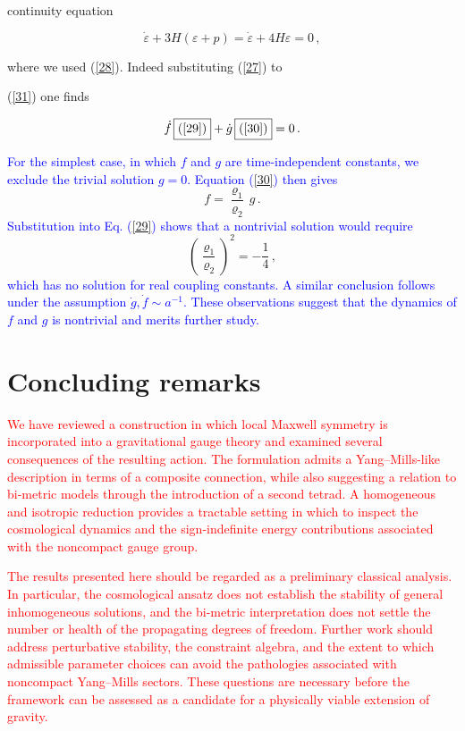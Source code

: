 \documentclass [prd,reprint,eqsecnum,nofootinbib]  {revtex4-1}
\newcommand{\corr}[1]{\textcolor{blue}{#1}}
\newcommand{\add}[1]{\textcolor{red}{#1}}
\begin{document}
continuity equation

\begin{equation}\label{31}

\dot \varepsilon +3H(\varepsilon+p)= \dot \varepsilon

+4H\varepsilon=0\,,

\end{equation}

where we used (\ref{28}). Indeed substituting (\ref{27}) to

(\ref{31}) one finds

\begin{equation}\label{32}

    \dot f\, \mbox{\framebox{(\ref{29})}} +\dot g\, \mbox{\framebox{(\ref{30})}}=0\,.

\end{equation}







\corr{For the simplest case, in which $f$ and $g$ are
time-independent constants, we exclude the trivial solution $g=0$.
Equation (\ref{30}) then gives}
$$f=\frac{\varrho_1}{\varrho_2}\,g\,.$$
\corr{Substitution into Eq. (\ref{29}) shows that a nontrivial
solution would require}
$$\left(\frac{\varrho_1}{\varrho_2}\right)^2=-\frac1{4}\,,$$
\corr{which has no solution for real coupling constants. A similar
conclusion follows under the assumption
$\dot g,\dot f\sim a^{-1}$. These observations suggest that the
dynamics of $f$ and $g$ is nontrivial and merits further study.}

\section{Concluding remarks}

\add{We have reviewed a construction in which local Maxwell symmetry is
incorporated into a gravitational gauge theory and examined several
consequences of the resulting action. The formulation admits a
Yang--Mills-like description in terms of a composite connection, while
also suggesting a relation to bi-metric models through the introduction
of a second tetrad. A homogeneous and isotropic reduction provides a
tractable setting in which to inspect the cosmological dynamics and the
sign-indefinite energy contributions associated with the noncompact
gauge group.}

\add{The results presented here should be regarded as a preliminary
classical analysis. In particular, the cosmological ansatz does not
establish the stability of general inhomogeneous solutions, and the
bi-metric interpretation does not settle the number or health of the
propagating degrees of freedom. Further work should address perturbative
stability, the constraint algebra, and the extent to which admissible
parameter choices can avoid the pathologies associated with
noncompact Yang--Mills sectors. These questions are necessary before
the framework can be assessed as a candidate for a physically viable
extension of gravity.}
\end{document}
